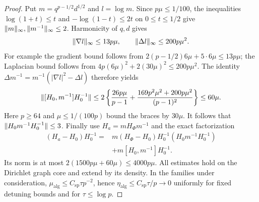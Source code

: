 \begin{proof}
Put $m=q^{p-1/2}d^{1/2}$ and $l=\log m$.
Since $p\mu\le1/100$, the inequalities
$\log(1+t)\le t$ and $-\log(1-t)\le2t$ on $0\le t\le1/2$
give $\lVert m\rVert_\infty,\lVert m^{-1}\rVert_\infty\le2$.
Harmonicity of $q,d$ gives
\[
 \lVert \nabla l\rVert_\infty\le13p\mu,
 \qquad \lVert \Delta l\rVert_\infty\le200p\mu^2.
\]
For example the gradient bound follows from
$2(p-1/2)6\mu+5\cdot6\mu\le13p\mu$;
the Laplacian bound follows from
$4p(6\mu)^2+2(30\mu)^2\le200p\mu^2$.
The identity
$\Delta m^{-1}=m^{-1}(|\nabla l|^2-\Delta l)$ therefore yields
\[
 \lVert [H_0,m^{-1}]H_0^{-1}\rVert
 \le2\left\{\frac{26p\mu}{p-1}
      +\frac{169p^2\mu^2+200p\mu^2}{(p-1)^2}\right\}
 \le60\mu.
\]
Here $p\ge64$ and $\mu\le1/(100p)$ bound the braces by $30\mu$.
It follows that $\lVert H_0m^{-1}H_0^{-1}\rVert\le3$.
Finally use $H_a=mH_\Phi m^{-1}$ and the exact factorization
\begin{align*}
 (H_a-H_0)H_0^{-1}
 ={}&m(H_\Phi-H_0)H_0^{-1}(H_0m^{-1}H_0^{-1})\\
    &+m[H_0,m^{-1}]H_0^{-1}.
\end{align*}
Its norm is at most $2(1500p\mu+60\mu)\le4000p\mu$.
All estimates hold on the Dirichlet graph core and extend by its
density. In the families under consideration,
$\mu_{\mathrm{alg}}\le C_{\mathrm{sp}}\tau p^{-2}$, hence
$\eta_{\mathrm{alg}}\le C_{\mathrm{sp}}\tau/p\to0$ uniformly for
fixed detuning bounds and for $\tau\le\log p$.
\end{proof}

